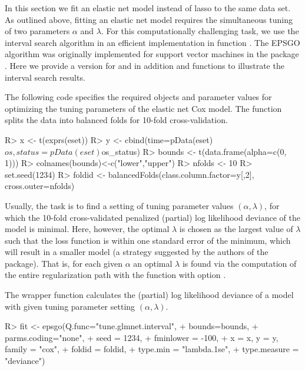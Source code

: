 \documentclass[nojss]{jss}
\begin{document}
In this section we fit an elastic net model instead of lasso to the same data set. As outlined above, fitting an elastic net model requires the simultaneous tuning of two parameters $\alpha$ and $\lambda$. For this computationally challenging task, we use the interval search algorithm in an efficient implementation in  function . The EPSGO algorithm was originally implemented for support vector machines in the  package  \citep{becker2009,penSVM}. Here we provide a version for  and in addition  and  functions to illustrate the interval search results.

The following code specifies the required objects and parameter values for optimizing the tuning parameters of the elastic net Cox model. The  function splits the data into balanced folds for 10-fold cross-validation.
\begin{Schunk}
\begin{Sinput}
R>   x <- t(exprs(eset))
R>   y <- cbind(time=pData(eset)$os,status=pData(eset)$os_status)
R>   bounds <- t(data.frame(alpha=c(0, 1)))
R>   colnames(bounds)<-c("lower","upper")
R>   nfolds <- 10
R>   set.seed(1234)
R>   foldid <- balancedFolds(class.column.factor=y[,2], cross.outer=nfolds)
\end{Sinput}
\end{Schunk}

Usually, the task is to find a setting of tuning parameter values $\left(\alpha,\lambda\right)$, for which the 10-fold cross-validated penalized (partial) log likelihood deviance of the model is minimal. Here, however, the optimal $\lambda$ is chosen as the largest value of $\lambda$ such that the loss function is within one standard error of the minimum, which will result in a smaller model (a strategy suggested by the authors of the  package). That is, for each given $\alpha$ an optimal $\lambda$ is found via the computation of the entire regularization path with the  function with option .

The wrapper function  calculates the (partial) log likelihood deviance of a model with given tuning parameter setting $\left(\alpha,\lambda\right)$.

\begin{Schunk}
\begin{Sinput}
R>   fit <- epsgo(Q.func="tune.glmnet.interval", 
+               bounds=bounds, 
+               parms.coding="none", 
+               seed = 1234, 
+               fminlower = -100,
+               x = x, y = y, family = "cox", 
+               foldid = foldid,
+               type.min = "lambda.1se",
+               type.measure = "deviance")
\end{Sinput}
\end{Schunk}
\end{document}

